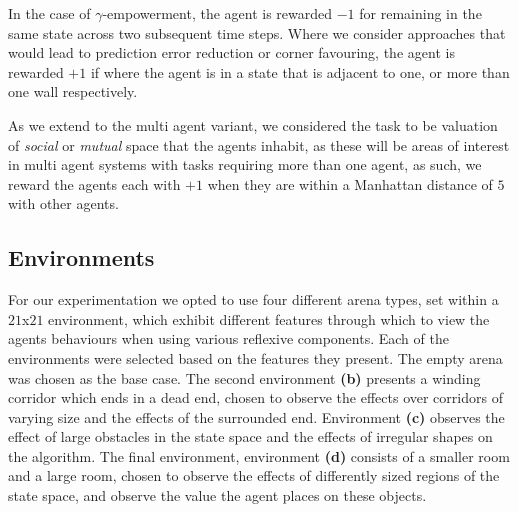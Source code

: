 \documentclass{article}
\begin{document}

In the case of $\gamma$-empowerment, the agent is rewarded $-1$ for remaining in the same state across two subsequent time steps. Where we consider approaches that would lead to prediction error reduction or corner favouring, the agent is rewarded $+1$ if where the agent is in a state that is adjacent to one, or more than one wall respectively.

As we extend to the multi agent variant, we considered the task to be valuation of \emph{social} or \emph{mutual} space that the agents inhabit, as these will be areas of interest in multi agent systems with tasks requiring more than one agent, as such, we reward the agents each with $+1$ when they are within a Manhattan distance of $5$ with other agents.

\subsection{Environments}

For our experimentation we opted to use four different arena types, set within a $21$x$21$ environment, which exhibit different features through which to view the agents behaviours when using various reflexive components.%
Each of the environments were selected based on the features they present. The empty arena was chosen as the base case. The second environment \textbf{(b)} presents a winding corridor which ends in a dead end, chosen to observe the effects over corridors of varying size and the effects of the surrounded end. Environment \textbf{(c)} observes the effect of large obstacles in the state space and the effects of irregular shapes on the algorithm. The final environment, environment \textbf{(d)} consists of a smaller room and a large room, chosen to observe the effects of differently sized regions of the state space, and observe the value the agent places on these objects. 
\end{document}
